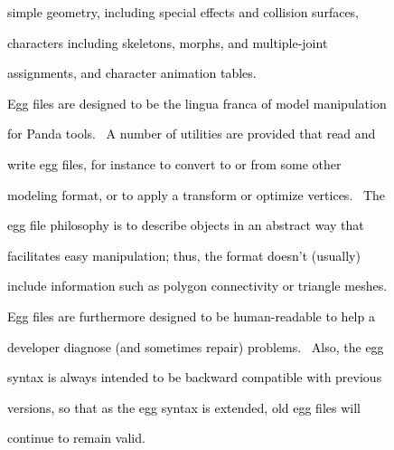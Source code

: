\documentclass[a4paper]{article}
\newcommand\textstyleOOoComputerKeyWord[1]{\textrm{\textcolor[rgb]{0.0,0.0,0.5019608}{#1}}}
\begin{document}
{\color{black}
\textstyleOOoComputerKeyWord{\textcolor{black}{simple geometry, including special effects and collision surfaces,}}}

{\color{black}
\textstyleOOoComputerKeyWord{\textcolor{black}{characters including skeletons, morphs, and multiple-joint}}}

{\color{black}
\textstyleOOoComputerKeyWord{\textcolor{black}{assignments, and character animation tables. \ }}}


\bigskip

{\color{black}
\textstyleOOoComputerKeyWord{\textcolor{black}{Egg files are designed to be the lingua franca of model manipulation}}}

{\color{black}
\textstyleOOoComputerKeyWord{\textcolor{black}{for Panda tools. \ A number of utilities are provided that read and}}}

{\color{black}
\textstyleOOoComputerKeyWord{\textcolor{black}{write egg files, for instance to convert to or from some other}}}

{\color{black}
\textstyleOOoComputerKeyWord{\textcolor{black}{modeling format, or to apply a transform or optimize vertices. \ The}}}

{\color{black}
\textstyleOOoComputerKeyWord{\textcolor{black}{egg file philosophy is to describe objects in an abstract way that}}}

{\color{black}
\textstyleOOoComputerKeyWord{\textcolor{black}{facilitates easy manipulation; thus, the format doesn't (usually)}}}

{\color{black}
\textstyleOOoComputerKeyWord{\textcolor{black}{include information such as polygon connectivity or triangle meshes.}}}

{\color{black}
\textstyleOOoComputerKeyWord{\textcolor{black}{Egg files are furthermore designed to be human-readable to help a}}}

{\color{black}
\textstyleOOoComputerKeyWord{\textcolor{black}{developer diagnose (and sometimes repair) problems. \ Also, the egg}}}

{\color{black}
\textstyleOOoComputerKeyWord{\textcolor{black}{syntax is always intended to be backward compatible with previous}}}

{\color{black}
\textstyleOOoComputerKeyWord{\textcolor{black}{versions, so that as the egg syntax is extended, old egg files will}}}

{\color{black}
\textstyleOOoComputerKeyWord{\textcolor{black}{continue to remain valid.}}}


\bigskip
\end{document}
